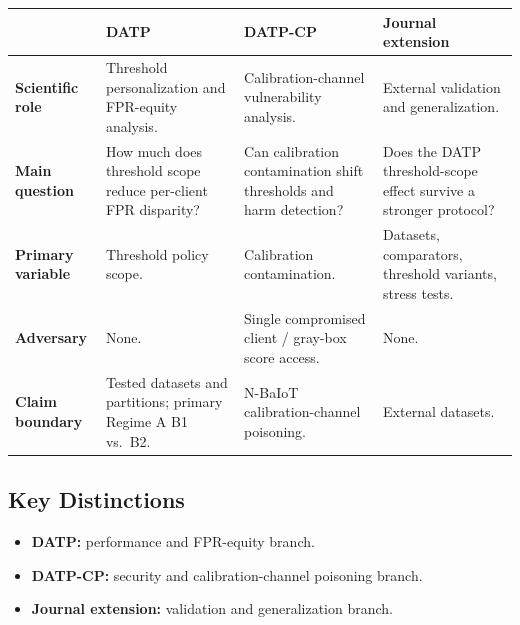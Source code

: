 \vspace{0.3em}
\begin{tabularx}{\linewidth}{@{} >{\bfseries\small}p{3.2cm}
                                    >{\small}X
                                    >{\small}X
                                    >{\small}X @{}}
\toprule
\normalfont & \textbf{DATP} & \textbf{DATP-CP} & \textbf{Journal extension}\\
\midrule
Scientific role
  & Threshold personalization and FPR-equity analysis.
  & Calibration-channel vulnerability analysis.
  & External validation and generalization.\\[4pt]
Main question
  & How much does threshold scope reduce per-client FPR disparity?
  & Can calibration contamination shift thresholds and harm detection?
  & Does the DATP threshold-scope effect survive a stronger protocol?\\[4pt]
Primary variable
  & Threshold policy scope.
  & Calibration contamination.
  & Datasets, comparators, threshold variants, stress tests.\\[4pt]
Adversary
  & None.
  & Single compromised client / gray-box score access.
  & None.\\[4pt]
Claim boundary
  & Tested datasets and partitions; primary Regime A B1 vs.\ B2.
  & N-BaIoT calibration-channel poisoning.
  & External datasets.\\
\bottomrule
\end{tabularx}
\vspace{0.3em}

\subsection{Key Distinctions}

\begin{itemize}
  \item \textbf{DATP:} performance and FPR-equity branch.
  \item \textbf{DATP-CP:} security and calibration-channel poisoning branch.
  \item \textbf{Journal extension:} validation and generalization branch.
\end{itemize}

\clearpage
